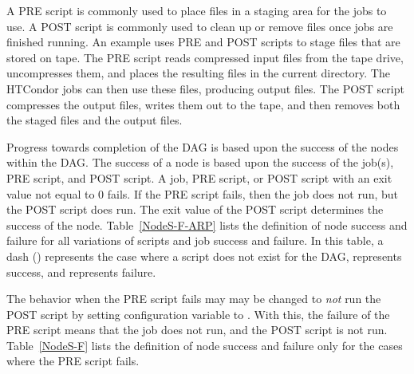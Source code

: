 \begin{itemize}
A PRE script is commonly used
to place files in a staging area for the jobs to use.
A POST script is commonly used
to clean up or remove files once jobs are finished running.
An example uses PRE and POST scripts to stage files
that are stored on tape.
The PRE script reads compressed input files from the tape drive,
uncompresses them, and places the resulting files in the current directory.
The HTCondor jobs can then use these files,
producing output files.
The POST script compresses the output files, writes them out to
the tape, and then removes both the staged files and the output files.

Progress towards completion of the DAG is based upon
the success of the nodes within the DAG.
The success of a node is based upon the success of 
the job(s), PRE script, and POST script.
A job, PRE script, or POST script with an exit value not equal to 0 fails.  
If the PRE script fails, 
then the job does not run, but the POST script does run.
The exit value of the POST script determines the success of the node. 
Table~\ref{NodeS-F-ARP} lists the definition of node success and
failure for all variations of scripts and job success and failure.
In this table, a dash (\Expr{-}) represents the case where a script
does not exist for the DAG,  represents success, 
and   represents failure.

The behavior when the PRE script fails may
may be changed to \emph{not} run the POST script
by setting configuration variable  
to .
With this, the failure of the PRE script
means that the job does not run, and the POST script is not run.
Table~\ref{NodeS-F} lists the definition of node success and
failure only for the cases where the PRE script fails.



\end{itemize}
